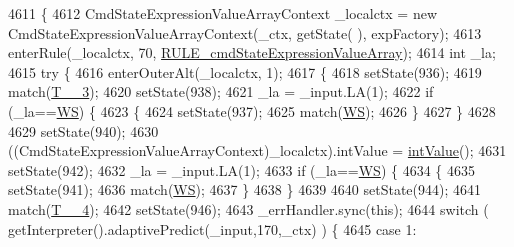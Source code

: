 \begin{DoxyCode}
4611                                                                                                            
                                     \{
4612     CmdStateExpressionValueArrayContext \_localctx = \textcolor{keyword}{new} CmdStateExpressionValueArrayContext(\_ctx, getState(
      ), expFactory);
4613     enterRule(\_localctx, 70, \hyperlink{classgov_1_1nasa_1_1jpf_1_1inspector_1_1server_1_1expression_1_1parser_1_1_expression_grammar_parser_a8296432b43cef8e3962833d4cb9ef032}{RULE\_cmdStateExpressionValueArray});
4614     \textcolor{keywordtype}{int} \_la;
4615     \textcolor{keywordflow}{try} \{
4616       enterOuterAlt(\_localctx, 1);
4617       \{
4618       setState(936);
4619       match(\hyperlink{classgov_1_1nasa_1_1jpf_1_1inspector_1_1server_1_1expression_1_1parser_1_1_expression_grammar_parser_a68f9589dcc3fc777455467ff010385ea}{T\_\_3});
4620       setState(938);
4621       \_la = \_input.LA(1);
4622       \textcolor{keywordflow}{if} (\_la==\hyperlink{classgov_1_1nasa_1_1jpf_1_1inspector_1_1server_1_1expression_1_1parser_1_1_expression_grammar_parser_ace44714ae633c7b14794cc5a24d9ebf3}{WS}) \{
4623         \{
4624         setState(937);
4625         match(\hyperlink{classgov_1_1nasa_1_1jpf_1_1inspector_1_1server_1_1expression_1_1parser_1_1_expression_grammar_parser_ace44714ae633c7b14794cc5a24d9ebf3}{WS});
4626         \}
4627       \}
4628 
4629       setState(940);
4630       ((CmdStateExpressionValueArrayContext)\_localctx).intValue = \hyperlink{classgov_1_1nasa_1_1jpf_1_1inspector_1_1server_1_1expression_1_1parser_1_1_expression_grammar_parser_a8c7e4b657a12e07efe3ea6429cb9cdcf}{intValue}();
4631       setState(942);
4632       \_la = \_input.LA(1);
4633       \textcolor{keywordflow}{if} (\_la==\hyperlink{classgov_1_1nasa_1_1jpf_1_1inspector_1_1server_1_1expression_1_1parser_1_1_expression_grammar_parser_ace44714ae633c7b14794cc5a24d9ebf3}{WS}) \{
4634         \{
4635         setState(941);
4636         match(\hyperlink{classgov_1_1nasa_1_1jpf_1_1inspector_1_1server_1_1expression_1_1parser_1_1_expression_grammar_parser_ace44714ae633c7b14794cc5a24d9ebf3}{WS});
4637         \}
4638       \}
4639 
4640       setState(944);
4641       match(\hyperlink{classgov_1_1nasa_1_1jpf_1_1inspector_1_1server_1_1expression_1_1parser_1_1_expression_grammar_parser_ae620c05745b7d42e86cfe3f8113e22d2}{T\_\_4});
4642       setState(946);
4643       \_errHandler.sync(\textcolor{keyword}{this});
4644       \textcolor{keywordflow}{switch} ( getInterpreter().adaptivePredict(\_input,170,\_ctx) ) \{
4645       \textcolor{keywordflow}{case} 1:

\end{DoxyCode}
